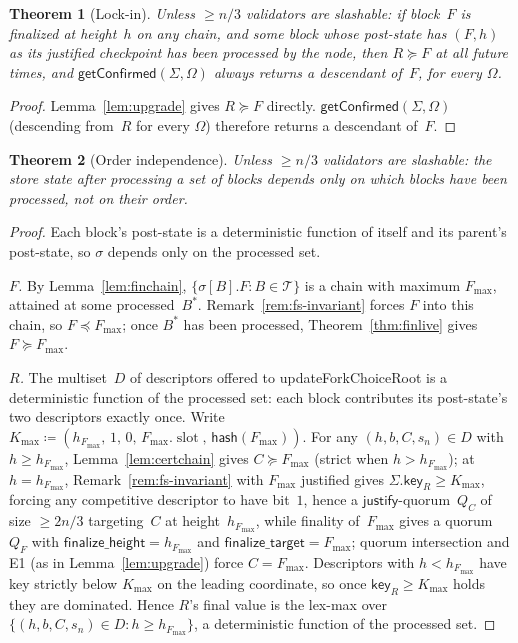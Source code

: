 \ifx\litemode\undefined\documentclass{article}\fi
\newcommand{\T}[0]{\ensuremath{\mathcal{T}}}
\newcommand{\slot}[0]{\ensuremath{\operatorname{\mathrm{slot}}}}
\newcommand{\just}{\ensuremath{\mathsf{justify}}\xspace}
\newcommand{\finalizeHeight}{\mathsf{finalize\_height}}
\newcommand{\finalizeTarget}{\mathsf{finalize\_target}}
\newcommand{\hash}{\mathsf{hash}}
\newcommand{\key}{\mathsf{key}}
\newcommand{\updateForkChoiceRoot}{\textsf{updateForkChoiceRoot}\xspace}
\newcommand{\getConfirmed}{\textsf{getConfirmed}\xspace}
\theoremstyle{plain}
\newtheorem{theorem}{Theorem}
\theoremstyle{definition}
\theoremstyle{remark}
\begin{document}
\begin{theorem}[Lock-in]\label{thm:lockin}
Unless $\geq n/3$ validators are slashable: if block~$F$ is finalized at height~$h$ on any chain, and some block whose post-state has $(F, h)$ as its justified checkpoint has been processed by the node, then $R \succeq F$ at all future times, and $\getConfirmed(\Sigma, \Omega)$ always returns a descendant of~$F$, for every $\Omega$.
\end{theorem}

\begin{proof}
Lemma~\ref{lem:upgrade} gives $R \succeq F$ directly.
$\getConfirmed(\Sigma, \Omega)$ (descending from~$R$ for every $\Omega$) therefore returns a descendant of~$F$.
\end{proof}

\begin{theorem}[Order independence]\label{thm:orderindep}
Unless $\geq n/3$ validators are slashable: the store state after processing a set of blocks depends only on which blocks have been processed, not on their order.
\end{theorem}

\begin{proof}
Each block's post-state is a deterministic function of itself and its parent's post-state, so $\sigma$ depends only on the processed set.

\emph{$F$.} By Lemma~\ref{lem:finchain}, $\{\sigma[B].F : B \in \T\}$ is a chain with maximum $F_{\max}$, attained at some processed~$B^\ast$.
Remark~\ref{rem:fs-invariant} forces $F$ into this chain, so $F \preceq F_{\max}$; once $B^\ast$ has been processed, Theorem~\ref{thm:finlive} gives $F \succeq F_{\max}$.

\emph{$R$.} The multiset~$D$ of descriptors offered to \updateForkChoiceRoot is a deterministic function of the processed set: each block contributes its post-state's two descriptors exactly once.
Write $K_{\max} \coloneqq (h_{F_{\max}},\, 1,\, 0,\, F_{\max}.\slot,\, \hash(F_{\max}))$.
For any $(h, b, C, s_n) \in D$ with $h \geq h_{F_{\max}}$, Lemma~\ref{lem:certchain} gives $C \succeq F_{\max}$ (strict when $h > h_{F_{\max}}$); at $h = h_{F_{\max}}$, Remark~\ref{rem:fs-invariant} with $F_{\max}$ justified gives $\Sigma.\key_R \geq K_{\max}$, forcing any competitive descriptor to have bit~$1$, hence a \just-quorum~$Q_C$ of size $\geq 2n/3$ targeting~$C$ at height~$h_{F_{\max}}$, while finality of~$F_{\max}$ gives a quorum~$Q_F$ with $\finalizeHeight = h_{F_{\max}}$ and $\finalizeTarget = F_{\max}$; quorum intersection and E1 (as in Lemma~\ref{lem:upgrade}) force $C = F_{\max}$.
Descriptors with $h < h_{F_{\max}}$ have key strictly below $K_{\max}$ on the leading coordinate, so once $\key_R \geq K_{\max}$ holds they are dominated.
Hence $R$'s final value is the lex-max over $\{(h, b, C, s_n) \in D : h \geq h_{F_{\max}}\}$, a deterministic function of the processed set.
\end{proof}
\end{document}
